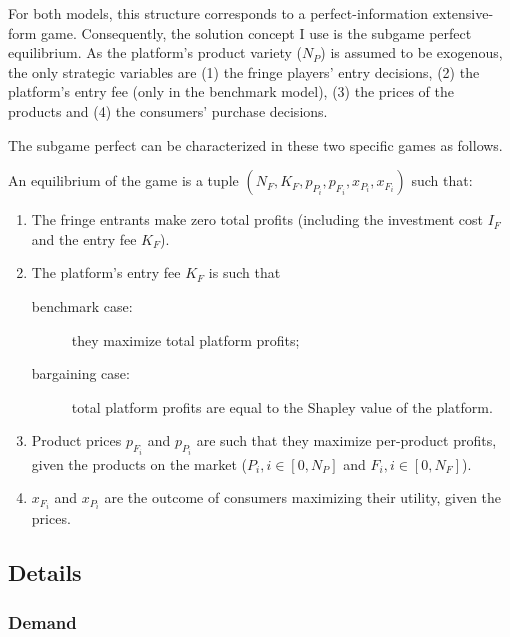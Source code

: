 For both models, this structure corresponds to a perfect-information extensive-form game.
Consequently, the solution concept I use is the subgame perfect equilibrium.
As the platform's product variety ($N_P$) is assumed to be exogenous, the only strategic variables are (1) the fringe players' entry decisions, (2) the platform's entry fee (only in the benchmark model), (3) the prices of the products and (4) the consumers' purchase decisions.

The subgame perfect can be characterized in these two specific games as follows.
\begin{definition}
    \label{def:equilibrium}
    An equilibrium of the game is a tuple $(N_F, K_F, p_{P_i}, p_{F_i}, x_{P_i}, x_{F_i})$ such that:
    \begin{enumerate}
        \item The fringe entrants make zero total profits (including the investment cost $I_F$ and the entry fee $K_F$).
        \item The platform's entry fee $K_F$ is such that
        \begin{description}
            \item[benchmark case:] they maximize total platform profits;
            \item[bargaining case:] total platform profits are equal to the Shapley value of the platform.
        \end{description}
        \item Product prices $p_{F_i}$ and $p_{P_i}$ are such that they maximize per-product profits, given the products on the market ($P_i, i \in [0, N_P]$ and $F_i, i \in [0, N_F]$).
        \item $x_{F_i}$ and $x_{P_i}$ are the outcome of consumers maximizing their utility, given the prices.
    \end{enumerate}
\end{definition}

\subsection{Details}
\label{sec:model_details}

\subsubsection{Demand}
\label{sec:demand}

